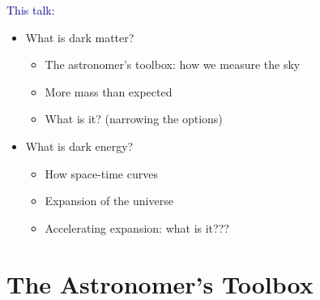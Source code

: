 \documentclass[compress]{beamer}
\begin{document}
\begin{frame}
\begin{center}
\begin{minipage}{0.9\linewidth}
\vspace{0.5 cm}
\textcolor{darkblue}{\huge This talk:}

\Large
\vspace{0.5 cm}
\begin{itemize}\setlength{\itemsep}{0.5 cm}
\item What is dark matter?
\begin{itemize}
\item The astronomer's toolbox: how we measure the sky
\item More mass than expected
\item What is it? (narrowing the options)
\end{itemize}

\item What is dark energy?
\begin{itemize}
\item How space-time curves
\item Expansion of the universe
\item Accelerating expansion: what is it???
\end{itemize}
\end{itemize}

\end{minipage}
\end{center}
\end{frame}

\section*{The Astronomer's Toolbox}
\end{document}
